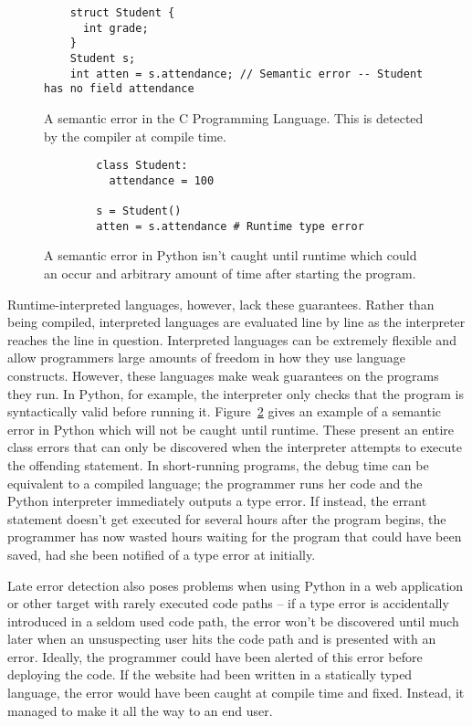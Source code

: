 \documentclass{article}[12pt]
\begin{document}
\begin{figure} \begin{verbatim} 
    struct Student { 
      int grade; 
    } 
    Student s; 
    int atten = s.attendance; // Semantic error -- Student has no field attendance 
  \end{verbatim} 
  \caption{A semantic error in the C Programming Language. This is
    detected by the compiler at compile time.} 
  \label{fig:csemanticerror}
\end{figure}

\begin{figure}
    \begin{verbatim}
        class Student:
          attendance = 100

        s = Student()
        atten = s.attendance # Runtime type error
    \end{verbatim}
    \caption{A semantic error in Python isn't caught until runtime which could an occur and
    arbitrary amount of time after starting the program.}
    \label{fig:pythonsemanticerror}
\end{figure}

Runtime-interpreted languages, however, lack these guarantees. Rather than being compiled,
interpreted languages are evaluated line by line as the interpreter reaches the line in question.
Interpreted languages can be extremely flexible and allow programmers large amounts of freedom in
how they use language constructs. However, these languages make weak guarantees on the programs they
run. In Python, for example, the interpreter only checks that the program is syntactically valid
before running it. Figure~\ref{fig:pythonsemanticerror} gives an example of a semantic error in
Python which will not be caught until runtime. These present an entire class errors that can only be
discovered when the interpreter attempts to execute the offending statement. In short-running
programs, the debug time can be equivalent to a compiled language; the programmer runs her code and
the Python interpreter immediately outputs a type error. If instead, the errant statement doesn't
get executed for several hours after the program begins, the programmer has now wasted hours waiting
for the program that could have been saved, had she been notified of a type error at
initially. 

Late error detection also poses problems when using Python in a web application or other target with rarely executed
code paths -- if a type error is accidentally introduced in a seldom used code path, the error won't be discovered until
much later when an unsuspecting user hits the code path and is presented with an error. Ideally, the programmer could have been
alerted of this error before deploying the code. If the website had been written in a statically typed language, the
error would have been caught at compile time and fixed. Instead, it managed to make it all the way to an end user.
\end{document}

